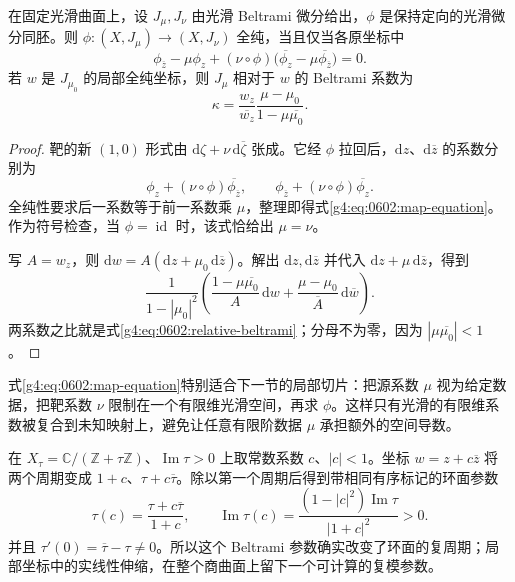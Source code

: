 \begin{proposition}\label{g4:prop:0602:change-of-structure}
	在固定光滑曲面上，设 \(J_\mu,J_\nu\) 由光滑 Beltrami 微分给出，\(\phi\) 是保持定向的光滑微分同胚。则 \(\phi:(X,J_\mu)\to(X,J_\nu)\) 全纯，当且仅当各原坐标中
	\begin{equation}\label{g4:eq:0602:map-equation}
		\phi_{\overline z}-\mu\phi_z
		+(\nu\circ\phi)
		\bigl(\overline{\phi_z}-\mu\overline{\phi_{\overline z}}\bigr)=0.
	\end{equation}
	若 \(w\) 是 \(J_{\mu_0}\) 的局部全纯坐标，则 \(J_\mu\) 相对于 \(w\) 的 Beltrami 系数为
	\begin{equation}\label{g4:eq:0602:relative-beltrami}
		\kappa
		=\frac{w_z}{\overline{w_z}}
		\frac{\mu-\mu_0}{1-\mu\overline{\mu_0}}.
	\end{equation}
\end{proposition}
\begin{proof}
	靶的新 \((1,0)\) 形式由 \(\mathrm{d}\zeta+\nu\,\mathrm{d}\overline\zeta\) 张成。它经 \(\phi\) 拉回后，\(\mathrm{d}z\)、\(\mathrm{d}\overline z\) 的系数分别为
	\[
		\phi_z+(\nu\circ\phi)\overline{\phi_{\overline z}},
		\qquad
		\phi_{\overline z}+(\nu\circ\phi)\overline{\phi_z}.
	\]
	全纯性要求后一系数等于前一系数乘 \(\mu\)，整理即得式\eqref{g4:eq:0602:map-equation}。作为符号检查，当 \(\phi=\operatorname{id}\) 时，该式恰给出 \(\mu=\nu\)。

	写 \(A=w_z\)，则 \(\mathrm{d}w=A(\mathrm{d}z+\mu_0\,\mathrm{d}\overline z)\)。解出 \(\mathrm{d}z,\mathrm{d}\overline z\) 并代入 \(\mathrm{d}z+\mu\,\mathrm{d}\overline z\)，得到
	\[
		\frac1{1-|\mu_0|^2}
		\left(
		\frac{1-\mu\overline{\mu_0}}A\,\mathrm{d}w
		+\frac{\mu-\mu_0}{\overline A}\,\mathrm{d}\overline w
		\right).
	\]
	两系数之比就是式\eqref{g4:eq:0602:relative-beltrami}；分母不为零，因为 \(|\mu\overline{\mu_0}|<1\)。
\end{proof}

式\eqref{g4:eq:0602:map-equation}特别适合下一节的局部切片：把源系数 \(\mu\) 视为给定数据，把靶系数 \(\nu\) 限制在一个有限维光滑空间，再求 \(\phi\)。这样只有光滑的有限维系数被复合到未知映射上，避免让任意有限阶数据 \(\mu\) 承担额外的空间导数。

\begin{example}\label{g4:exm:0602:torus-parameter}
	在 \(X_\tau=\mathbb C/(\mathbb Z+\tau\mathbb Z)\)、\(\operatorname{Im}\tau>0\) 上取常数系数 \(c\)、\(|c|<1\)。坐标 \(w=z+c\overline z\) 将两个周期变成 \(1+c\)、\(\tau+c\overline\tau\)。除以第一个周期后得到带相同有序标记的环面参数
	\[
		\tau(c)=\frac{\tau+c\overline\tau}{1+c},\qquad
		\operatorname{Im}\tau(c)
		=\frac{(1-|c|^2)\operatorname{Im}\tau}{|1+c|^2}>0.
	\]
	并且 \(\tau'(0)=\overline\tau-\tau\ne0\)。所以这个 Beltrami 参数确实改变了环面的复周期；局部坐标中的实线性伸缩，在整个商曲面上留下一个可计算的复模参数。
\end{example}
